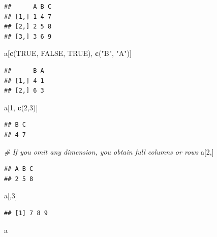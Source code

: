 \documentclass[]{book}
\newenvironment{Shaded}{\begin{snugshade}}{\end{snugshade}}
\newcommand{\KeywordTok}[1]{\textcolor[rgb]{0.13,0.29,0.53}{\textbf{{#1}}}}
\newcommand{\DecValTok}[1]{\textcolor[rgb]{0.00,0.00,0.81}{{#1}}}
\newcommand{\StringTok}[1]{\textcolor[rgb]{0.31,0.60,0.02}{{#1}}}
\newcommand{\CommentTok}[1]{\textcolor[rgb]{0.56,0.35,0.01}{\textit{{#1}}}}
\newcommand{\OtherTok}[1]{\textcolor[rgb]{0.56,0.35,0.01}{{#1}}}
\newcommand{\NormalTok}[1]{{#1}}
\begin{document}
\begin{verbatim}
##      A B C
## [1,] 1 4 7
## [2,] 2 5 8
## [3,] 3 6 9
\end{verbatim}

\begin{Shaded}
\begin{Highlighting}[]
\NormalTok{a[}\KeywordTok{c}\NormalTok{(}\OtherTok{TRUE}\NormalTok{, }\OtherTok{FALSE}\NormalTok{, }\OtherTok{TRUE}\NormalTok{), }\KeywordTok{c}\NormalTok{(}\StringTok{"B"}\NormalTok{, }\StringTok{"A"}\NormalTok{)]}
\end{Highlighting}
\end{Shaded}

\begin{verbatim}
##      B A
## [1,] 4 1
## [2,] 6 3
\end{verbatim}

\begin{Shaded}
\begin{Highlighting}[]
\NormalTok{a[}\DecValTok{1}\NormalTok{, }\KeywordTok{c}\NormalTok{(}\DecValTok{2}\NormalTok{,}\DecValTok{3}\NormalTok{)]}
\end{Highlighting}
\end{Shaded}

\begin{verbatim}
## B C 
## 4 7
\end{verbatim}

\begin{Shaded}
\begin{Highlighting}[]
\CommentTok{# If you omit any dimension, you obtain full columns or rows}
\NormalTok{a[}\DecValTok{2}\NormalTok{,]}
\end{Highlighting}
\end{Shaded}

\begin{verbatim}
## A B C 
## 2 5 8
\end{verbatim}

\begin{Shaded}
\begin{Highlighting}[]
\NormalTok{a[,}\DecValTok{3}\NormalTok{]}
\end{Highlighting}
\end{Shaded}

\begin{verbatim}
## [1] 7 8 9
\end{verbatim}

\begin{Shaded}
\begin{Highlighting}[]
\NormalTok{a}
\end{Highlighting}
\end{Shaded}
\end{document}
